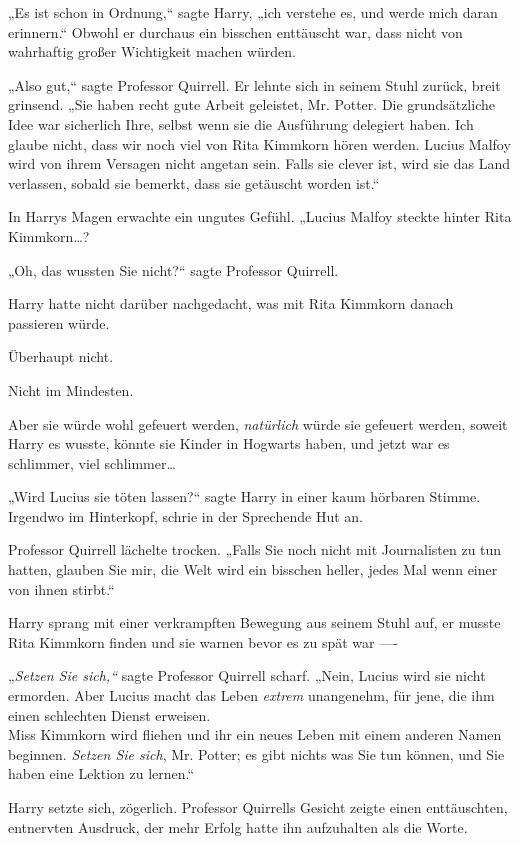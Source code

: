 {„Es ist schon in Ordnung,“ sagte Harry, „ich verstehe es, und werde mich daran erinnern.“ Obwohl er durchaus ein bisschen enttäuscht war, dass nicht von wahrhaftig großer Wichtigkeit machen würden.

„Also gut,“ sagte Professor Quirrell. Er lehnte sich in seinem Stuhl zurück, breit grinsend. „Sie haben recht gute Arbeit geleistet, Mr. Potter. Die grundsätzliche Idee war sicherlich Ihre, selbst wenn sie die Ausführung delegiert haben. Ich glaube nicht, dass wir noch viel von Rita Kimmkorn hören werden. Lucius Malfoy wird von ihrem Versagen nicht angetan sein. Falls sie clever ist, wird sie das Land verlassen, sobald sie bemerkt, dass sie getäuscht worden ist.“

In Harrys Magen erwachte ein ungutes Gefühl. „Lucius Malfoy steckte hinter Rita Kimmkorn…?

„Oh, das wussten Sie nicht?“ sagte Professor Quirrell.

Harry hatte nicht darüber nachgedacht, was mit Rita Kimmkorn danach passieren würde.

Überhaupt nicht.

Nicht im Mindesten.

Aber sie würde wohl gefeuert werden, \emph{natürlich} würde sie gefeuert werden, soweit Harry es wusste, könnte sie Kinder in Hogwarts haben, und jetzt war es schlimmer, viel schlimmer…

„Wird Lucius sie töten lassen?“ sagte Harry in einer kaum hörbaren Stimme. Irgendwo im Hinterkopf, schrie in der Sprechende Hut an.

Professor Quirrell lächelte trocken. „Falls Sie noch nicht mit Journalisten zu tun hatten, glauben Sie mir, die Welt wird ein bisschen heller, jedes Mal wenn einer von ihnen stirbt.“

Harry sprang mit einer verkrampften Bewegung aus seinem Stuhl auf, er musste Rita Kimmkorn finden und sie warnen bevor es zu spät war ----

„\emph{Setzen Sie sich,“} sagte Professor Quirrell scharf. „Nein, Lucius wird sie nicht ermorden. Aber Lucius macht das Leben \emph{extrem} unangenehm, für jene, die ihm einen schlechten Dienst erweisen.\\ Miss Kimmkorn wird fliehen und ihr ein neues Leben mit einem anderen Namen beginnen. \emph{Setzen Sie sich}, Mr. Potter; es gibt nichts was Sie tun können, und Sie haben eine Lektion zu lernen.“

Harry setzte sich, zögerlich. Professor Quirrells Gesicht zeigte einen enttäuschten, entnervten Ausdruck, der mehr Erfolg hatte ihn aufzuhalten als die Worte.

}
